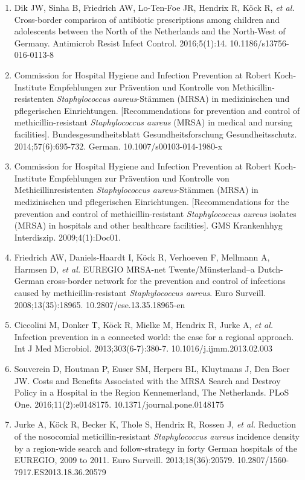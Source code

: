 \documentclass[
]{book}
\begin{document}
\begin{enumerate}
\item
  Dik JW, Sinha B, Friedrich AW, Lo-Ten-Foe JR, Hendrix R, Köck R, \emph{et al.} Cross-border comparison of antibiotic prescriptions among children and adolescents between the North of the Netherlands and the North-West of Germany. Antimicrob Resist Infect Control. 2016;5(1):14. 10.1186/s13756-016-0113-8
\item
  Commission for Hospital Hygiene and Infection Prevention at Robert Koch-Institute Empfehlungen zur Prävention und Kontrolle von Methicillin-resistenten \emph{Staphylococcus aureus}-Stämmen (MRSA) in medizinischen und pflegerischen Einrichtungen. {[}Recommendations for prevention and control of methicillin-resistant \emph{Staphylococcus aureus} (MRSA) in medical and nursing facilities{]}. Bundesgesundheitsblatt Gesundheitsforschung Gesundheitsschutz. 2014;57(6):695-732. German. 10.1007/s00103-014-1980-x
\item
  Commission for Hospital Hygiene and Infection Prevention at Robert Koch-Institute Empfehlungen zur Prävention und Kontrolle von Methicillinresistenten \emph{Staphylococcus aureus}-Stämmen (MRSA) in medizinischen und pflegerischen Einrichtungen. {[}Recommendations for the prevention and control of methicillin-resistant \emph{Staphylococcus aureus} isolates (MRSA) in hospitals and other healthcare facilities{]}. GMS Krankenhhyg Interdiszip. 2009;4(1):Doc01.
\item
  Friedrich AW, Daniels-Haardt I, Köck R, Verhoeven F, Mellmann A, Harmsen D, \emph{et al.} EUREGIO MRSA-net Twente/Münsterland--a Dutch-German cross-border network for the prevention and control of infections caused by methicillin-resistant \emph{Staphylococcus aureus}. Euro Surveill. 2008;13(35):18965. 10.2807/ese.13.35.18965-en
\item
  Ciccolini M, Donker T, Köck R, Mielke M, Hendrix R, Jurke A, \emph{et al.} Infection prevention in a connected world: the case for a regional approach. Int J Med Microbiol. 2013;303(6-7):380-7. 10.1016/j.ijmm.2013.02.003
\item
  Souverein D, Houtman P, Euser SM, Herpers BL, Kluytmans J, Den Boer JW. Costs and Benefits Associated with the MRSA Search and Destroy Policy in a Hospital in the Region Kennemerland, The Netherlands. PLoS One. 2016;11(2):e0148175. 10.1371/journal.pone.0148175
\item
  Jurke A, Köck R, Becker K, Thole S, Hendrix R, Rossen J, \emph{et al.} Reduction of the nosocomial meticillin-resistant \emph{Staphylococcus aureus} incidence density by a region-wide search and follow-strategy in forty German hospitals of the EUREGIO, 2009 to 2011. Euro Surveill. 2013;18(36):20579. 10.2807/1560-7917.ES2013.18.36.20579

\end{enumerate}
\end{document}
